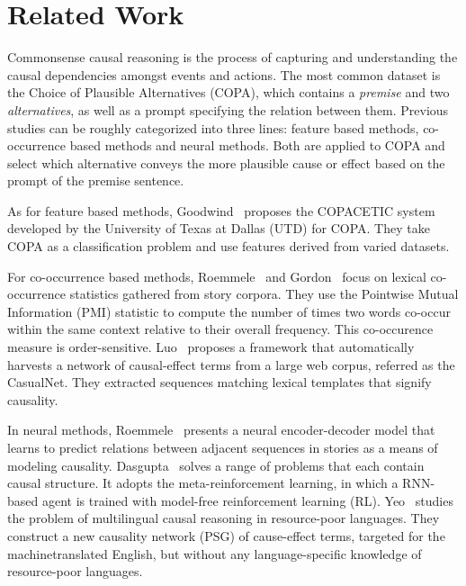 \section{Related Work}
\label{sec:related}

Commonsense causal reasoning is the process of capturing
and understanding the causal dependencies amongst events
and actions. The most common dataset is 
the Choice of Plausible Alternatives (COPA), which 
contains a \textit{premise} and two \textit{alternatives},
as well as a prompt specifying the relation between them.
Previous studies can be roughly categorized into three
lines: feature based methods, co-occurrence based methods and neural methods. 
Both are applied to COPA and select
which alternative conveys the more plausible cause or effect 
based on the prompt of the premise sentence.

As for feature based methods, Goodwind~ 
proposes the COPACETIC system developed
by the University of Texas at Dallas (UTD) for COPA. They take COPA 
as a classification problem and use features
derived from varied datasets.

For co-occurrence based methods, Roemmele~ 
and Gordon~
focus on lexical co-occurrence statistics  gathered from story corpora.
They use the Pointwise Mutual Information (PMI) statistic\cite{church1990word}
to compute the number of times two words co-occur
within the same context relative to their overall frequency. 
This co-occurence measure is order-sensitive. 
Luo~ proposes a framework that
automatically harvests a network of causal-effect terms from
a large web corpus, referred as the CasualNet.
They extracted sequences matching lexical templates that signify causality.

In neural methods, Roemmele~
presents a neural encoder-decoder model that learns to predict relations 
between adjacent sequences in stories as a means of modeling causality. 
Dasgupta~ solves a range of problems
that each contain causal structure.
It adopts the meta-reinforcement learning,
in which a RNN-based agent is trained with model-free reinforcement learning (RL).
Yeo~ studies the problem of 
multilingual causal reasoning in resource-poor languages.
They construct a new causality network (PSG) of cause-effect terms, 
targeted for the machinetranslated English, 
but without any language-specific knowledge of resource-poor languages.

